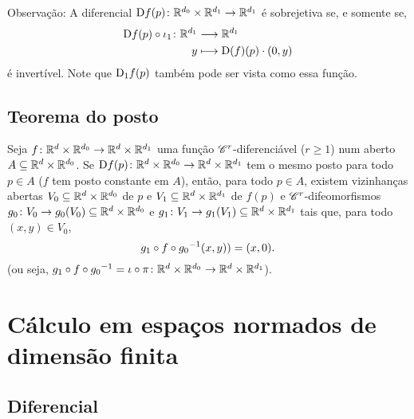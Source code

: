 Observação: A diferencial $\mathrm{D} f(p)\colon \mathbb{R}^{d_0} \times \mathbb{R}^{d_1} \to \mathbb{R}^{d_1}$ é sobrejetiva se, e somente se,
	\begin{align*}
	{\mathrm{D}f(p) \circ \iota_1}\colon {\mathbb{R}^{d_1}} &\longrightarrow {\mathbb{R}^{d_1}} \\{y} &\longmapsto \mathrm{D}(f)(p) \cdot (0,y)
	\end{align*}
é invertível. Note que $\mathrm{D}_1 f(p)$ também pode ser vista como essa função.

\subsection{Teorema do posto}

\begin{proposition}
Seja $f\colon \mathbb{R}^{d} \times \mathbb{R}^{d_0} \to \mathbb{R}^{d} \times \mathbb{R}^{d_1}$ uma função $\mathscr{C}^r$-diferenciável ($r \geq 1$) num aberto $A \subseteq \mathbb{R}^{d} \times \mathbb{R}^{d_0}$. Se $\mathrm{D} f(p)\colon \mathbb{R}^{d} \times \mathbb{R}^{d_0} \to \mathbb{R}^{d} \times \mathbb{R}^{d_1}$ tem o mesmo posto para todo $p \in A$ ($f$ tem posto constante em $A$), então, para todo $p \in A$, existem vizinhanças abertas $V_0 \subseteq \mathbb{R}^{d} \times \mathbb{R}^{d_0}$ de $p$ e $V_1 \subseteq \mathbb{R}^{d} \times \mathbb{R}^{d_1}$ de $f(p)$ e $\mathscr{C}^r$-difeomorfismos $g_0\colon V_0 \to g_0(V_0) \subseteq \mathbb{R}^{d} \times \mathbb{R}^{d_0}$ e $g_1\colon V_1 \to g_1(V_1) \subseteq \mathbb{R}^{d} \times \mathbb{R}^{d_1}$ tais que, para todo $(x,y) \in V_0$, 
	\begin{equation*}
	g_1 \circ f \circ {g_0}^{-1}(x,y))=(x,0).
	\end{equation*}
(ou seja, $g_1 \circ f \circ {g_0}^{-1} = \iota \circ \pi\colon \mathbb{R}^{d} \times \mathbb{R}^{d_0} \to \mathbb{R}^{d} \times \mathbb{R}^{d_1}$).
\end{proposition}















\cleardoublepage
\section{Cálculo em espaços normados de dimensão finita}

\subsection{Diferencial}

